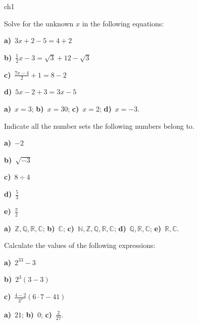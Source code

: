 
\begin{exercises}{ch1}	


	\begin{exercise}
		Solve for the unknown $x$ in the following equations:

		\twocol
		\textbf{a)}~$3x+2-5=4+2$

		\textbf{b)}~$\frac{1}{2}x-3=\sqrt{3}+12-\sqrt{3}$
		\endtwocol

		\twocol
		\textbf{c)}~$\frac{7x-4}{2} +1 = 8-2$
		
		\textbf{d)}~$5x-2+3=3x-5$
		\endtwocol
				
		\begin{eanswer}\textbf{a)}~$x=3$; \textbf{b)}~$x=30$; \textbf{c)}~$x=2$; \textbf{d)}~$x=-3$.\end{eanswer}
	\end{exercise}


	\begin{exercise}
		Indicate all the number sets the following numbers belong to.
				
		\fivecol
		\textbf{a)}~$-2$ 

		\textbf{b)}~$\sqrt{-3}$
		
		\textbf{c)}~$8 \div 4$
		
		\textbf{d)}~$\frac{5}{3}$
		
		\textbf{e)}~$\frac{\pi}{2}$
		
		\endfivecol
		
		\begin{eanswer}\textbf{a)}~$\mathbb{Z}, \mathbb{Q}, \mathbb{R},\mathbb{C}$;
					\textbf{b)}~$\mathbb{C}$;
					\textbf{c)}~$\mathbb{N},\mathbb{Z}, \mathbb{Q}, \mathbb{R},\mathbb{C}$;
					\textbf{d)}~$\mathbb{Q}, \mathbb{R},\mathbb{C}$;
					\textbf{e)}~$\mathbb{R},\mathbb{C}$.\end{eanswer}
	\end{exercise}

	

	\begin{exercise}
		Calculate the values of the following expressions:
		
		\threecol
		\textbf{a)}~$2^33-3$ 

		\textbf{b)}~$2^3(3-3)$
		
		\textbf{c)}~$\frac{4-2}{3^3}(6\cdot 7- 41)$
		\endthreecol
		
		\begin{eanswer}\textbf{a)}~$21$; \textbf{b)}~$0$; \textbf{c)}~$\frac{2}{27}$.\end{eanswer}
	\end{exercise}	



\end{exercises}
